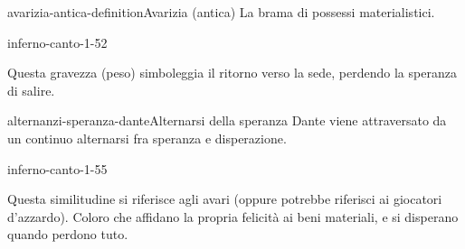 \documentclass[preview]{standalone}
\begin{document}
\begin{snippetdefinition}{avarizia-antica-definition}{Avarizia (antica)}
    La brama di possessi materialistici.
\end{snippetdefinition}


\begin{snippet}{inferno-canto-1-52}

    Questa gravezza (peso) simboleggia il ritorno verso la sede, perdendo la speranza di salire.
\end{snippet}

\begin{snippetnote}{alternanzi-speranza-dante}{Alternarsi della speranza}
    Dante viene attraversato da un continuo alternarsi fra speranza e disperazione.
\end{snippetnote}

\begin{snippet}{inferno-canto-1-55}

    Questa similitudine si riferisce agli avari (oppure potrebbe riferisci ai giocatori d'azzardo).
    Coloro che affidano la propria felicità ai beni materiali, e si disperano quando perdono tuto.
\end{snippet}
\end{document}
